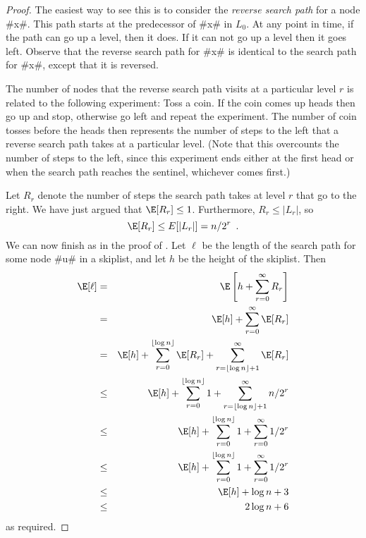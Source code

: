 \begin{proof}
  The easiest way to see this is to consider the \emph{reverse search
  path} for a node #x#.  This path starts at the predecessor of #x#
  in $L_0$.  At any point in time, if the path can go up a level, then
  it does.  If it can not go up a level then it goes left.  Observe that
  the reverse search path for #x# is identical to the search path for #x#,
  except that it is reversed.
  
  The number of nodes that the reverse search path visits at a particular
  level $r$ is related to the following experiment:  Toss a coin.
  If the coin comes up heads then go up and stop, otherwise go left and
  repeat the experiment.  The number of coin tosses before the heads then
  represents the number of steps to the left that a reverse search path
  takes at a particular level.  (Note that this overcounts the number of
  steps to the left, since this experiment ends either at the first head
  or when the search path reaches the sentinel, whichever comes first.)
  
  Let $R_r$ denote the number of steps the search path takes at level
  $r$ that go to the right.   We have just argued that $\E[R_r]\le 1$.
  Furthermore, $R_r\le |L_r|$, so
  \[
    \E[R_r] \le E[|L_r|] = n/2^r \enspace .
  \]
  We can now finish as in the proof of .
  Let $\ell$ be  the length of the search path for some node #u# in a
  skiplist, and let $h$ be the height of the skiplist.  Then
  \begin{eqnarray*}
      \E[\ell] 
         &=& \E\left[ h + \sum_{r=0}^\infty R_r \right] \\
         &=& \E[h] + \sum_{r=0}^\infty \E[R_r]  \\
         &=& \E[h] + \sum_{r=0}^{\lfloor\log n\rfloor} \E[R_r] 
              + \sum_{r=\lfloor\log n\rfloor+1}^\infty \E[R_r] \\
         &\le& \E[h] + \sum_{r=0}^{\lfloor\log n\rfloor} 1
              + \sum_{r=\lfloor\log n\rfloor+1}^\infty n/2^r \\
         &\le& \E[h] + \sum_{r=0}^{\lfloor\log n\rfloor} 1
              + \sum_{r=0}^{\infty} 1/2^r \\
         &\le& \E[h] + \sum_{r=0}^{\lfloor\log n\rfloor} 1
              + \sum_{r=0}^{\infty} 1/2^r \\
         &\le& \E[h] + \log n + 3 \\
         &\le& 2\log n + 6
  \end{eqnarray*}
  as required.
\end{proof}


